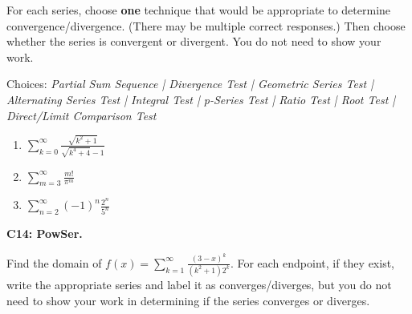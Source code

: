 \documentclass[12pt]{article}
\newcommand{\<}{\left\langle}
\renewcommand{\>}{\right\rangle}
\newcommand{\exerciseHeader}[4]{


  \vspace{0.5em}
  \textbf{#2}
  \vspace{0.5em}

}
\begin{document}
\begin{multicols}{2}
For each series, choose \textbf{one} technique that
would be appropriate to determine convergence/divergence. (There may be
multiple correct responses.) Then choose
whether the series is convergent or divergent. You do not need to show your
work.

Choices: \textit{Partial Sum Sequence |
 Divergence Test |
 Geometric Series Test |
 Alternating Series Test |
 Integral Test |
 p-Series Test |
 Ratio Test |
 Root Test |
 Direct/Limit Comparison Test}

\begin{enumerate}
  \item \(\sum_{k=0}^\infty\frac{\sqrt{k^2+1}}{\sqrt{k^4+4}-1}\)
  \item \(\sum_{m=3}^\infty\frac{m!}{\pi^m}\)
  \item \(\sum_{n=2}^\infty(-1)^n\frac{2^n}{5^n}\)
\end{enumerate}



%

%

%

\exerciseHeader{2017 July 24}{C14: PowSer.}{
Identify the domain of a function defined as a power series.
}{}

Find the domain of \(f(x)=\sum_{k=1}^\infty \frac{(3-x)^k}{(k^2+1)2^k}\).
For each endpoint, if they exist, write the appropriate series and label it
as converges/diverges, but you
do not need to show your work in determining if the series converges or
diverges.




\end{multicols}
\end{document}
